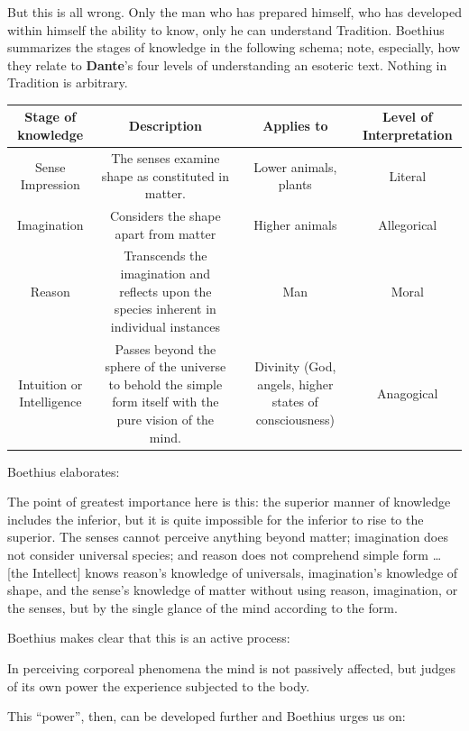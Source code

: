 But this is all wrong. Only the man who has prepared himself, who has developed within himself the ability to know, only he can understand Tradition. Boethius summarizes the stages of knowledge in the following schema; note, especially, how they relate to \textbf{Dante}'s four levels of understanding an esoteric text. Nothing in Tradition is arbitrary.

\begin{table}[h]\scriptsize
\begin{tabular}{cccc}\toprule 
Stage of knowledge &
Description &
Applies to &
Level of Interpretation\\\midrule
Sense Impression &
The senses examine shape as constituted in matter. &
Lower animals, plants &
Literal\\\midrule
Imagination &
Considers the shape apart from matter &
Higher animals &
Allegorical\\\midrule
Reason &
Transcends the imagination and reflects upon the species inherent in individual instances &
Man &
Moral\\\midrule
Intuition or Intelligence &
Passes beyond the sphere of the universe to behold the simple form itself with the pure vision of the mind. &
Divinity (God, angels, higher states of consciousness) &
Anagogical\\\bottomrule
\end{tabular}
\end{table}
Boethius elaborates:

\begin{quotex}
The point of greatest importance here is this: the superior manner of knowledge includes the inferior, but it is quite impossible for the inferior to rise to the superior. The senses cannot perceive anything beyond matter; imagination does not consider universal species; and reason does not comprehend simple form … [the Intellect] knows reason's knowledge of universals, imagination's knowledge of shape, and the sense's knowledge of matter without using reason, imagination, or the senses, but by the single glance of the mind according to the form.

\end{quotex}
Boethius makes clear that this is an active process:

\begin{quotex}
In perceiving corporeal phenomena the mind is not passively affected, but judges of its own power the experience subjected to the body.

\end{quotex}
This “power”, then, can be developed further and Boethius urges us on:

